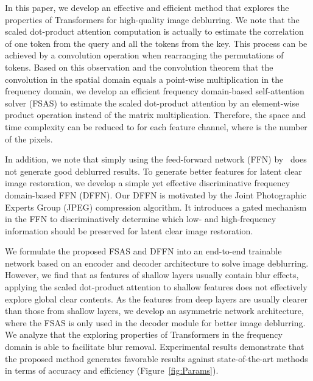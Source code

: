 \documentclass[10pt,twocolumn,letterpaper]{article}
\begin{document}
In this paper, we develop an effective and efficient method that explores the properties of Transformers for high-quality image deblurring.
We note that the scaled dot-product attention computation is actually to estimate the correlation of one token from the query and all the tokens from the key. This process can be achieved by a convolution operation when rearranging the permutations of tokens.
Based on this observation and the convolution theorem that the convolution in the spatial domain equals a point-wise multiplication in the frequency domain,
we develop an efficient frequency domain-based self-attention solver (FSAS) to estimate the scaled dot-product attention by an element-wise product operation instead of the matrix multiplication.
Therefore, the space and time complexity can be reduced to   for each feature channel, where  is the number of the pixels.


In addition, we note that simply using the feed-forward network (FFN) by~\cite{Restormer} does not generate good deblurred results.
To generate better features for latent clear image restoration, we develop a simple yet effective discriminative frequency domain-based FFN (DFFN).
Our DFFN is motivated by the Joint Photographic Experts Group (JPEG) compression algorithm. It introduces a gated mechanism in the FFN to discriminatively determine which low- and high-frequency information should be preserved for latent clear image restoration.


We formulate the proposed FSAS and DFFN into an end-to-end trainable network based on an encoder and decoder architecture to solve image deblurring.
However, we find that as features of shallow layers usually contain blur effects, applying the scaled dot-product attention to shallow features does not effectively explore global clear contents.
As the features from deep layers are usually clearer than those from shallow layers, we develop an asymmetric network architecture, where the FSAS is only used in the decoder module for better image deblurring.
We analyze that the exploring properties of Transformers in the frequency domain is able to facilitate blur removal. Experimental results demonstrate that the proposed method generates favorable results against state-of-the-art methods in terms of accuracy and efficiency (Figure~\ref{fig:Params}).
\end{document}

